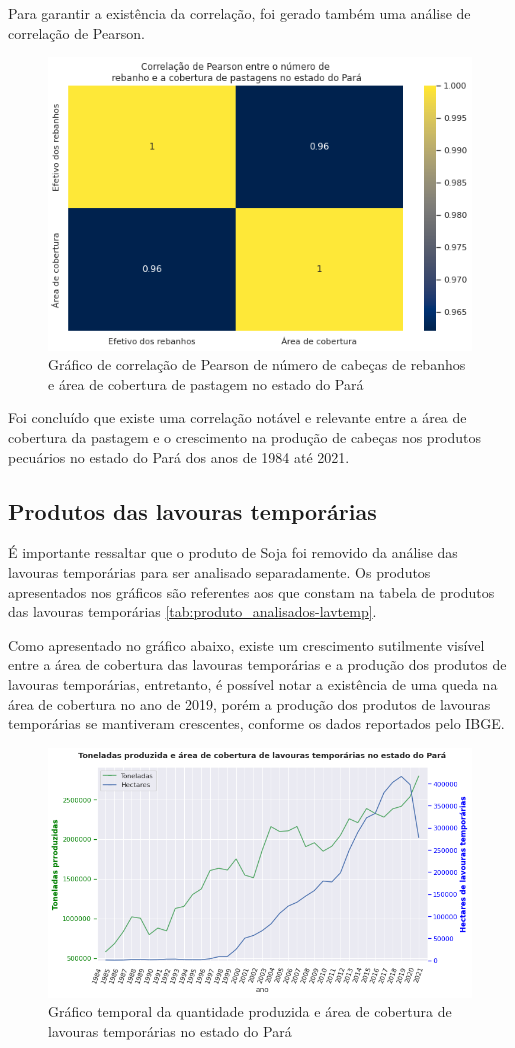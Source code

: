Para garantir a existência da correlação, foi gerado também uma análise de correlação de Pearson.

\begin{figure}[hbt!]
    \centering
    \includegraphics[width=0.6\columnwidth]{src/plots/plot_correlacao-cobertura_pastagem-numero_cabecas.png}
    \centering
    \caption{Gráfico de correlação de Pearson de número de cabeças de rebanhos e área de cobertura de pastagem no estado do Pará}
    \label{fig:correlacao-cobertura_pastagem-numero_cabecas}
\end{figure}

Foi concluído que existe uma correlação notável e relevante entre a área de cobertura da pastagem e o crescimento na produção de cabeças nos produtos pecuários no estado do Pará dos anos de 1984 até 2021.


\subsection{Produtos das lavouras temporárias}

É importante ressaltar que o produto de Soja foi removido da análise das lavouras temporárias para ser analisado separadamente. Os produtos apresentados nos gráficos são referentes aos que constam na tabela de produtos das lavouras temporárias \ref{tab:produto_analisados-lavtemp}.

Como apresentado no gráfico abaixo, existe um crescimento sutilmente visível entre a área de cobertura das lavouras temporárias e a produção dos produtos de lavouras temporárias, entretanto, é possível notar a existência de uma queda na área de cobertura no ano de 2019, porém a produção dos produtos de lavouras temporárias se mantiveram crescentes, conforme os dados reportados pelo IBGE.

\begin{figure}[hbt!]
    \centering
    \includegraphics[width=0.6\columnwidth]{src/plots/plot-lavouras_temp.png}
    \centering
    \caption{Gráfico temporal da quantidade produzida e área de cobertura de lavouras temporárias no estado do Pará}
    \label{fig:cobertura_pastagem-numero_cabeca}
\end{figure}

